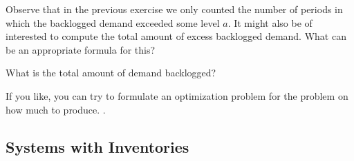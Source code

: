 \begin{exercise}
  Observe that in the previous exercise we only counted the number of
  periods in which the backlogged demand exceeded some level $a$. It
  might also be of interested to compute the total amount of
excess  backlogged demand. What can be an appropriate formula for this? 

\end{exercise}

\begin{exercise}
  What is the total amount of demand backlogged? 

\end{exercise}

\begin{exercise}
  If you like, you can try to formulate an optimization problem for
  the problem on how much to produce. .

\end{exercise}



\subsection{Systems with Inventories}
\label{sec:inventories}

